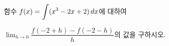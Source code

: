 함수 $f(x)=\displaystyle\int (x^3-2x+2)\mkern3mu dx$에 대하여\par\noindent $\displaystyle\lim_{h\to 0}\dfrac{f(-2+h)-f(-2-h)}{h}$의 값을 구하시오.
